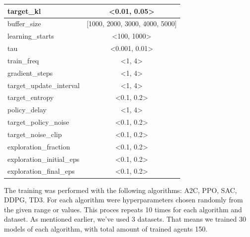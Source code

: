 \documentclass[../xlapes02]{subfiles}
\begin{document}
\begin{center}
\begin{tabular}{|l|c|}
            target\_kl                & <0.01, 0.05>                                    \\ \hline
            buffer\_size              & [1000, 2000, 3000, 4000, 5000]                  \\ \hline
            learning\_starts          & <100, 1000>                                     \\ \hline
            tau                       & <0.001, 0.01>                                   \\ \hline
            train\_freq               & <1, 4>                                          \\ \hline
            gradient\_steps           & <1, 4>                                          \\ \hline
            target\_update\_interval  & <1, 4>                                          \\ \hline
            target\_entropy           & <0.1, 0.2>                                      \\ \hline
            policy\_delay             & <1, 4>                                          \\ \hline
            target\_policy\_noise     & <0.1, 0.2>                                      \\ \hline
            target\_noise\_clip       & <0.1, 0.2>                                      \\ \hline
            exploration\_fraction     & <0.1, 0.2>                                      \\ \hline
            exploration\_initial\_eps & <0.1, 0.2>                                      \\ \hline
            exploration\_final\_eps   & <0.1, 0.2>                                      \\ \hline
        \end{tabular}
    \end{center}

    The training was performed with the following algorithms: A2C, PPO, SAC, DDPG, TD3. For each algorithm were hyperparameters chosen randomly from the given range or values. This proces repeats 10 times for each algorithm and dataset. As mentioned earlier, we've used 3 datasets. That means we trained 30 models of each algorithm, with total amount of trained agents 150.
\end{document}
